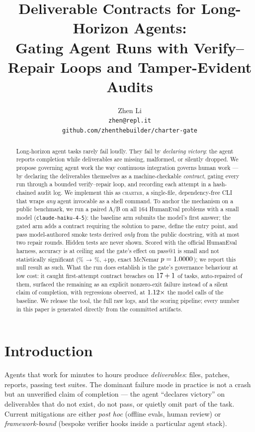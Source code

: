 \documentclass{article}
\title{Deliverable Contracts for Long-Horizon Agents:\\
Gating Agent Runs with Verify--Repair Loops and Tamper-Evident Audits}
\author{%
  Zhen Li\\
  \texttt{zhen@repl.it}\\
  \texttt{github.com/zhenthebuilder/charter-gate}
}
\begin{document}
\maketitle

\begin{abstract}
Long-horizon agent tasks rarely fail loudly. They fail by \emph{declaring victory}:
the agent reports completion while deliverables are missing, malformed, or silently
dropped. We propose governing agent work the way continuous integration governs human
work --- by declaring the deliverables themselves as a machine-checkable
\emph{contract}, gating every run through a bounded verify--repair loop, and recording
each attempt in a hash-chained audit log. We implement this as \textsc{charter}, a
single-file, dependency-free CLI that wraps \emph{any} agent invocable as a shell
command. To anchor the mechanism on a public benchmark, we run a paired A/B on all 164
HumanEval problems with a small model (\texttt{claude-haiku-4-5}): the baseline arm
submits the model's first answer; the gated arm adds a contract requiring the solution
to parse, define the entry point, and pass model-authored smoke tests derived
\emph{only} from the public docstring, with at most two repair rounds. Hidden tests are
never shown. Scored with the official HumanEval harness, accuracy is at ceiling and
the gate's effect on pass@1 is small and not statistically significant
(\numpAa\%\,$\rightarrow$\,\numpBb\%, +\numdeltapp{}pp, exact McNemar
$p=1.0000$); we report this null result as such. What the run does establish
is the gate's governance behaviour at low cost: it caught first-attempt contract
breaches on $17+1$ of \numntasks{} tasks, auto-repaired
\numrepairedB{} of them, surfaced the remaining \numunresolvedB{} as an explicit
nonzero-exit failure instead of a silent claim of completion, with \numbbroke{}
regressions observed, at $1.12\times$ the model calls of the baseline. We release the tool, the full raw logs, and the scoring pipeline; every
number in this paper is generated directly from the committed artifacts.
\end{abstract}

\section{Introduction}

Agents that work for minutes to hours produce \emph{deliverables}: files, patches,
reports, passing test suites. The dominant failure mode in practice is not a crash but
an unverified claim of completion --- the agent ``declares victory'' on deliverables
that do not exist, do not pass, or quietly omit part of the task. Current mitigations
are either \emph{post hoc} (offline evals, human review) or \emph{framework-bound}
(bespoke verifier hooks inside a particular agent stack).
\end{document}
